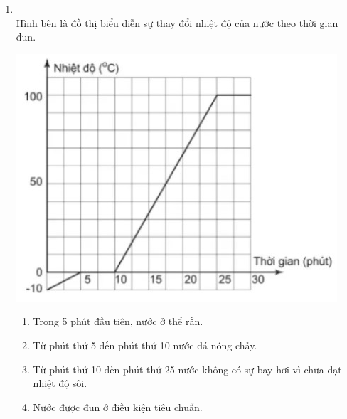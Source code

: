 \begin{enumerate}[label=\bfseries Câu \arabic*:, leftmargin=1.7cm]
\item {}\\
Hình bên là đồ thị biểu diễn sự thay đổi nhiệt độ của nước theo thời gian đun.
\begin{center}
	\includegraphics[width=0.45\linewidth]{../figs/VN12-Y24-PH-SYL-001P-4}
\end{center}
\begin{enumerate}[label=\alph*)]
	\item Trong 5 phút đầu tiên, nước ở thể rắn.
	\item Từ phút thứ 5 đến phút thứ 10 nước đá nóng chảy.
	\item Từ phút thứ 10 đến phút thứ 25 nước không có sự bay hơi vì chưa đạt nhiệt độ sôi.
	\item Nước được đun ở điều kiện tiêu chuẩn.
\end{enumerate}


\end{enumerate}
